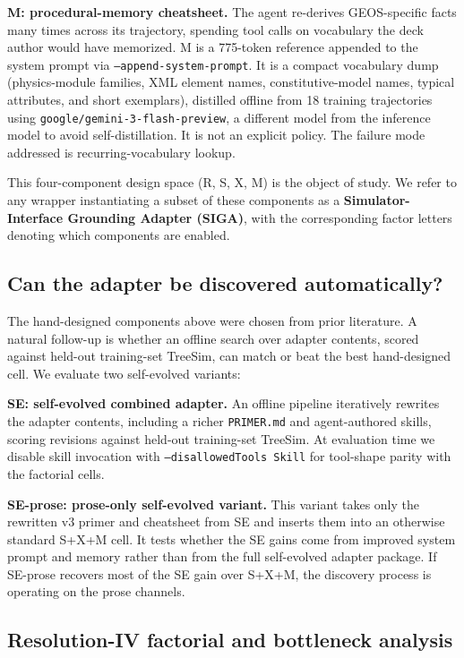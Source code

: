 \documentclass{article}
\begin{document}
\textbf{M: procedural-memory cheatsheet.} The agent re-derives GEOS-specific facts many times across its trajectory, spending tool calls on vocabulary the deck author would have memorized. M is a 775-token reference appended to the system prompt via \texttt{--append-system-prompt}. It is a compact vocabulary dump (physics-module families, XML element names, constitutive-model names, typical attributes, and short exemplars), distilled offline from 18 training trajectories using \texttt{google/gemini-3-flash-preview}, a different model from the inference model to avoid self-distillation. It is not an explicit policy. The failure mode addressed is recurring-vocabulary lookup.

This four-component design space (R, S, X, M) is the object of study. We refer to any wrapper instantiating a subset of these components as a \textbf{Simulator-Interface Grounding Adapter (SIGA)}, with the corresponding factor letters denoting which components are enabled.

\subsection{Can the adapter be discovered automatically?}
\label{subsec:self-evolved}

The hand-designed components above were chosen from prior literature. A natural follow-up is whether an offline search over adapter contents, scored against held-out training-set TreeSim, can match or beat the best hand-designed cell. We evaluate two self-evolved variants:

\textbf{SE: self-evolved combined adapter.} An offline pipeline iteratively rewrites the adapter contents, including a richer \texttt{PRIMER.md} and agent-authored skills, scoring revisions against held-out training-set TreeSim. At evaluation time we disable skill invocation with \texttt{--disallowedTools Skill} for tool-shape parity with the factorial cells.

\textbf{SE-prose: prose-only self-evolved variant.} This variant takes only the rewritten v3 primer and cheatsheet from SE and inserts them into an otherwise standard S+X+M cell. It tests whether the SE gains come from improved system prompt and memory rather than from the full self-evolved adapter package. If SE-prose recovers most of the SE gain over S+X+M, the discovery process is operating on the prose channels.

\subsection{Resolution-IV factorial and bottleneck analysis}
\label{subsec:cells}
\end{document}
